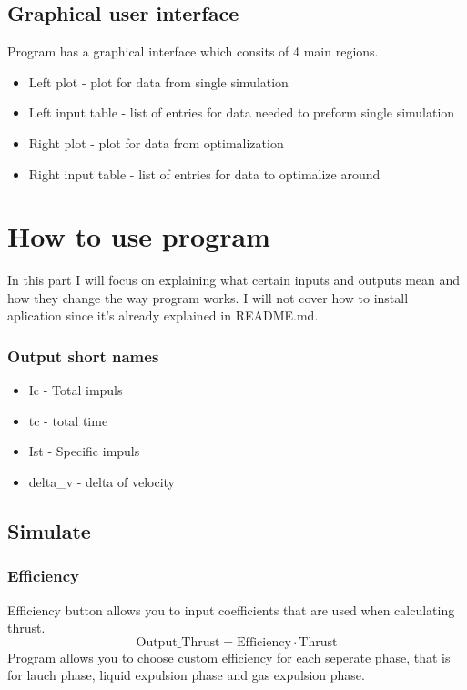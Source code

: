 \documentclass{report}
\begin{document}
\section{Graphical user interface}
Program has a graphical interface which consits of 4 main regions. 
\begin{itemize}
\item Left plot - plot for data from single simulation
\item Left input table - list of entries for data needed to preform single simulation
\item Right plot - plot for data from optimalization
\item Right input table - list of entries for data to optimalize around
\end{itemize}

\chapter{How to use program}
In this part I will focus on explaining what certain inputs and outputs mean and how they change the way program works. I will not cover how to install aplication since it's already explained in README.md. 

\subsection*{Output short names}
\begin{itemize}
\item Ic - Total impuls
\item tc - total time
\item Ist - Specific impuls
\item delta\_v - delta of velocity
\end{itemize}

\section{Simulate}

\subsection*{Efficiency}
Efficiency button allows you to input coefficients that are used when calculating thrust. 
$$\mbox{Output\_Thrust} = \mbox{Efficiency} \cdot \mbox{Thrust}$$
Program allows you to choose custom efficiency for each seperate phase, that is for lauch phase, liquid expulsion phase and gas expulsion phase. 
\end{document}
